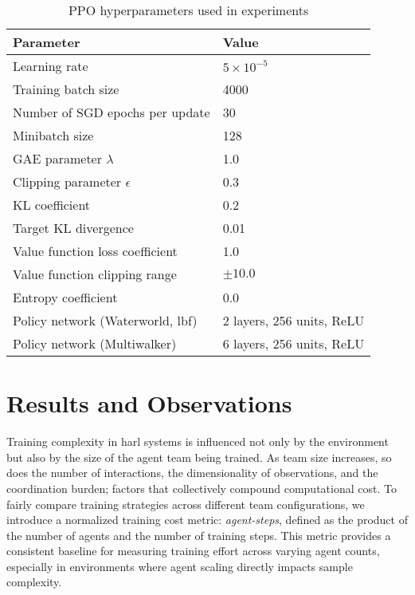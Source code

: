 \documentclass{article}
\begin{document}
\begin{table}[ht]
    \centering
    \caption{PPO hyperparameters used in experiments}
    \begin{tabular}{ll}
    \toprule
    \textbf{Parameter} & \textbf{Value} \\
    \midrule
    Learning rate & $5 \times 10^{-5}$ \\
    Training batch size & 4000 \\
    Number of SGD epochs per update & 30 \\
    Minibatch size & 128 \\
    GAE parameter $\lambda$ & 1.0 \\
    Clipping parameter $\epsilon$ & 0.3 \\
    KL coefficient & 0.2 \\
    Target KL divergence & 0.01 \\
    Value function loss coefficient & 1.0 \\
    Value function clipping range & $\pm 10.0$ \\
    Entropy coefficient & 0.0 \\
    Policy network (Waterworld, \gls{lbf}) & 2 layers, 256 units, ReLU \\%
    Policy network (Multiwalker) & 6 layers, 256 units, ReLU \\%
    \bottomrule
    \end{tabular}
    \label{con1:tab:ppo-hyperparams}
\end{table}

\FloatBarrier
\section{Results and Observations}
\label{con1:sec:results}

Training complexity in \gls{harl}
systems is influenced not only by the environment but also by the size of the agent 
team being trained. As team size increases, so does the number of interactions, 
the dimensionality of observations, and the coordination burden; factors that collectively 
compound computational cost. To fairly compare training strategies across different 
team configurations, we introduce a normalized training cost metric: \emph{agent-steps}, 
defined as the product of the number of agents and the number of training steps. 
This metric provides a consistent baseline for measuring training effort across 
varying agent counts, especially in environments where agent scaling directly 
impacts sample complexity.
\end{document}
